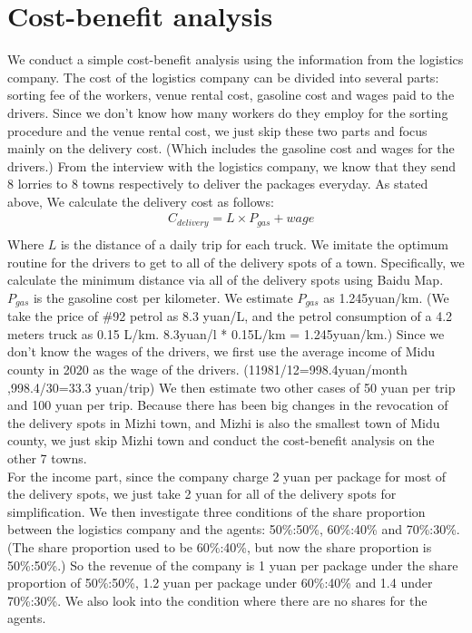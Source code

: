 \documentclass{article}
\begin{document}
\section{Cost-benefit analysis}
We conduct a simple cost-benefit analysis using the information from the logistics company. The cost of the logistics company can be divided into several parts: sorting fee of the workers, venue rental cost, gasoline cost and wages paid to the drivers. Since we don’t know how many workers do they employ for the sorting procedure and the venue rental cost, we just skip these two parts and focus mainly on the delivery cost. (Which includes the gasoline cost and wages for the drivers.) From the interview with the logistics company, we know that they send 8 lorries to 8 towns respectively to deliver the packages everyday. As stated above, We calculate the delivery cost as follows:\\
\begin{equation*}
    \begin{aligned}
        &C_{delivery}=L\times P_{gas}+wage\\
    \end{aligned}
\end{equation*}
\mbox{\hspace{2em}}
Where $L$ is the distance of a daily trip for each truck. We imitate the optimum routine for the drivers to get to all of the delivery spots of a town. Specifically, we calculate the minimum distance via all of the delivery spots using Baidu Map. $P_{gas}$  is the gasoline cost per kilometer. We estimate $P_{gas}$  as 1.245yuan/km. (We take the price of \#92 petrol as 8.3 yuan/L, and the petrol consumption of a 4.2 meters truck as 0.15 L/km. 8.3yuan/l * 0.15L/km = 1.245yuan/km.) Since we don’t know the wages of the drivers, we first use the average income of Midu county in 2020 as the wage of the drivers. (11981/12=998.4yuan/month ,998.4/30=33.3 yuan/trip) We then estimate two other cases of 50 yuan per trip and 100 yuan per trip. Because there has been big changes in the revocation of the delivery spots in Mizhi town, and Mizhi is also the smallest town of Midu county, we just skip Mizhi town and conduct the cost-benefit analysis on the other 7 towns.\\
\mbox{\hspace{2em}}
For the income part, since the company charge 2 yuan per package for most of the delivery spots, we just take 2 yuan for all of the delivery spots for simplification. We then investigate three conditions of the share proportion between the logistics company and the agents: 50\%:50\%, 60\%:40\% and 70\%:30\%. (The share proportion used to be 60\%:40\%, but now the share proportion is 50\%:50\%.) So the revenue of the company is 1 yuan per package under the share proportion of 50\%:50\%, 1.2 yuan per package under 60\%:40\% and 1.4 under 70\%:30\%. We also look into the condition where there are no shares for the agents.\\
\end{document}
